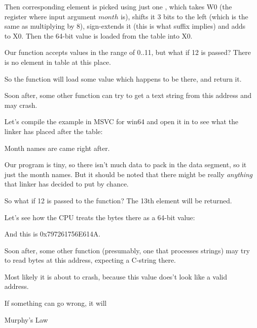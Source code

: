 Then corresponding element is picked using just one \LDR, which takes W0 
(the register where input argument $month$ is), shifts it 3 bits to the left (which is the same as multiplying by 8), 
sign-extends it (this is what  suffix implies) and adds to X0.
Then the 64-bit value is loaded from the table into X0.





Our function accepts values in the range of 0..11, but what if 12 is passed?
There is no element in table at this place.

So the function will load some value which happens to be there, and return it.

Soon after, some other function can try to get a text string from this address and may crash.

Let's compile the example in MSVC for win64 and open it in \IDA to see what the linker has placed after the table:



Month names are came right after.

Our program is tiny, so there isn't much data to pack in the data segment, 
so it just the month names.
But it should be noted that there might be really \emph{anything} that linker has decided to put by chance.

So what if 12 is passed to the function?
The 13th element will be returned.

Let's see how the CPU treats the bytes there as a 64-bit value:



And this is 0x797261756E614A.

Soon after, some other function (presumably, one that processes strings) may try to read bytes at 
this address, expecting a C-string there.

Most likely it is about to crash, because this value does't look like a valid address.


\epigraph{If something can go wrong, it will}{Murphy's Law}

